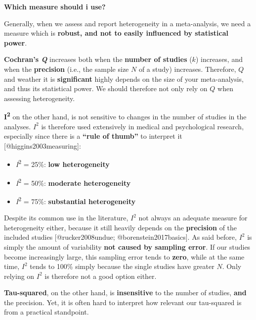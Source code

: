\documentclass[]{book}
\providecommand{\tightlist}{%
  \setlength{\itemsep}{0pt}\setlength{\parskip}{0pt}}
\theoremstyle{definition}
\theoremstyle{definition}
\theoremstyle{definition}
\theoremstyle{remark}
\begin{document}
\begin{rmdachtung}
\textbf{Which measure should i use?}

Generally, when we assess and report heterogeneity in a meta-analysis,
we need a measure which is \textbf{robust, and not to easily influenced
by statistical power}.

\textbf{Cochran's \emph{Q} } increases both when the \textbf{number of
studies} (\(k\)) increases, and when the \textbf{precision} (i.e., the
sample size \(N\) of a study) increases. Therefore, \(Q\) and weather it
is \textbf{significant} highly depends on the size of your
meta-analysis, and thus its statistical power. We should therefore not
only rely on \(Q\) when assessing heterogeneity.

\textbf{I\textsuperscript{2}} on the other hand, is not sensitive to
changes in the number of studies in the analyses. \(I^2\) is therefore
used extensively in medical and psychological research, especially since
there is a \textbf{``rule of thumb''} to interpret it
{[}@higgins2003measuring{]}:

\begin{itemize}
\tightlist
\item
  \emph{I}\textsuperscript{2} = 25\%: \textbf{low heterogeneity}
\item
  \emph{I}\textsuperscript{2} = 50\%: \textbf{moderate heterogeneity}
\item
  \emph{I}\textsuperscript{2} = 75\%: \textbf{substantial heterogeneity}
\end{itemize}

Despite its common use in the literature, \(I^2\) not always an adequate
measure for heterogeneity either, because it still heavily depends on
the \textbf{precision} of the included studies {[}@rucker2008undue;
@borenstein2017basics{]}. As said before, \(I^{2}\) is simply the amount
of variability \textbf{not caused by sampling error}. If our studies
become increasingly large, this sampling error tends to \textbf{zero},
while at the same time, \(I^{2}\) tends to 100\% simply because the
single studies have greater \(N\). Only relying on \(I^2\) is therefore
not a good option either.

\textbf{Tau-squared}, on the other hand, is \textbf{insensitive} to the
number of studies, \textbf{and} the precision. Yet, it is often hard to
interpret how relevant our tau-squared is from a practical standpoint.


\end{rmdachtung}
\end{document}
